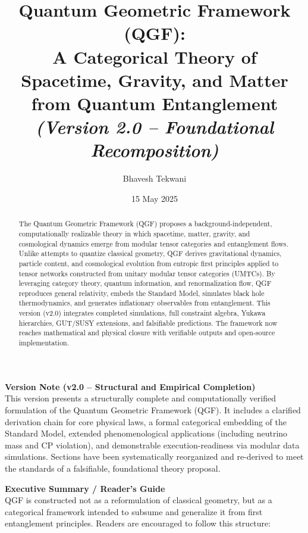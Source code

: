 \documentclass[11pt]{article}
\title{
\textbf{Quantum Geometric Framework (QGF):} \\
A Categorical Theory of Spacetime, Gravity, and Matter from Quantum Entanglement \\
\vspace{0.5em}
\large\textit{(Version 2.0 – Foundational Recomposition)}
}
\author[1]{Bhavesh Tekwani}
\affil[1]{\small\textit{Independent Researcher, United Kingdom \& India} \\
\texttt{bt@oractron.com} \\
\url{https://github.com/bt137}}
\date{15 May 2025}
\begin{document}
\maketitle

\begin{abstract}
The Quantum Geometric Framework (QGF) proposes a background-independent, computationally realizable theory in which spacetime, matter, gravity, and cosmological dynamics emerge from modular tensor categories and entanglement flows. Unlike attempts to quantize classical geometry, QGF derives gravitational dynamics, particle content, and cosmological evolution from entropic first principles applied to tensor networks constructed from unitary modular tensor categories (UMTCs). By leveraging category theory, quantum information, and renormalization flow, QGF reproduces general relativity, embeds the Standard Model, simulates black hole thermodynamics, and generates inflationary observables from entanglement. This version (v2.0) integrates completed simulations, full constraint algebra, Yukawa hierarchies, GUT/SUSY extensions, and falsifiable predictions. The framework now reaches mathematical and physical closure with verifiable outputs and open-source implementation.
\end{abstract}

\vspace{1em}

\noindent\textbf{Version Note (v2.0 – Structural and Empirical Completion)}\\
This version presents a structurally complete and computationally verified formulation of the Quantum Geometric Framework (QGF). It includes a clarified derivation chain for core physical laws, a formal categorical embedding of the Standard Model, extended phenomenological applications (including neutrino mass and CP violation), and demonstrable execution-readiness via modular data simulations. Sections have been systematically reorganized and re-derived to meet the standards of a falsifiable, foundational theory proposal.

\vspace{1.5em}

\noindent\textbf{Executive Summary / Reader’s Guide}\\
QGF is constructed not as a reformulation of classical geometry, but as a categorical framework intended to subsume and generalize it from first entanglement principles. Readers are encouraged to follow this structure:
\end{document}
